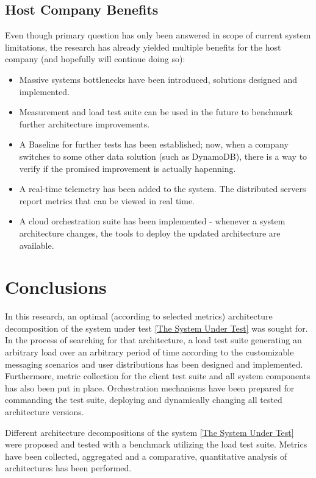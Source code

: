 \documentclass{uvamscse}
\begin{document}
\section{Host Company Benefits}
Even though primary question has only been answered in scope of current system limitations, the research has already yielded multiple benefits for the host company (and hopefully will continue doing so):
\begin{itemize}
  \item Massive systems bottlenecks have been introduced, solutions designed and implemented.
  \item Measurement and load test suite can be used in the future to benchmark further architecture improvements.
  \item A Baseline for further tests has been established; now, when a company switches to some other data solution (such as DynamoDB), there is a way to verify if the promised improvement is actually hapenning.
  \item A real-time telemetry has been added to the system. The distributed servers report metrics that can be viewed in real time.
  \item A cloud orchestration suite has been implemented - whenever a system architecture changes, the tools to deploy the updated architecture are available.
\end{itemize}

\chapter{Conclusions}\label{Conclusions}

In this research, an optimal (according to selected metrics) architecture decomposition of the system under test \ref{The System Under Test} was sought for. In the process of searching for that architecture, a load test suite generating an arbitrary load over an arbitrary period of time according to the customizable messaging scenarios and user distributions has been designed and implemented. Furthermore, metric collection for the client test suite and all system components has also been put in place. Orchestration mechanisms have been prepared for commanding the test suite, deploying and dynamically changing all tested architecture versions.

Different architecture decompositions of the system \ref{The System Under Test} were proposed and tested with a benchmark utilizing the load test suite. Metrics have been collected, aggregated and a comparative, quantitative analysis of architectures has been performed.
\end{document}
